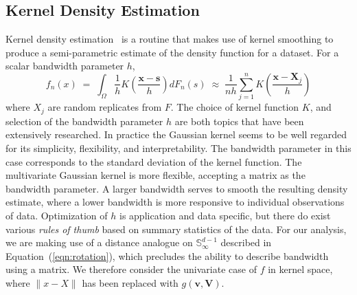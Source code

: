 
\subsection{Kernel Density Estimation}
Kernel density estimation~\citep{parzen1962} is a routine that makes use of 
    kernel smoothing to produce a semi-parametric estimate of the density
    function for a dataset.  For a scalar bandwidth parameter $h$,
    \[
        f_n(x) \;=\; 
            \int_{\Omega}\frac{1}{h}
                K\left(\frac{ \bm{x} - \bm{s}}{h}\right)dF_n(s) \;\approx\;
            \frac{1}{nh}\sum_{j = 1}^n
                K\left(\frac{ \bm{x} - \bm{X}_j}{h}\right)
    \]
    where $X_j$ are random replicates from $F$.  The choice of kernel function 
    $K$, and selection of the bandwidth parameter $h$ are both topics that have
    been extensively researched. In practice the Gaussian kernel seems to be 
    well regarded for its simplicity, flexibility, and interpretability.  The
    bandwidth parameter in this case corresponds to the standard deviation 
    of the kernel function.  The multivariate Gaussian kernel is more flexible,
    accepting a matrix as the bandwidth parameter.  A larger bandwidth serves 
    to smooth the resulting density estimate, where a lower bandwidth is more 
    responsive to individual observations of data.  Optimization of $h$ is 
    application and data specific, but there do exist various 
    \emph{rules of thumb} based on summary statistics of the data. For our 
    analysis, we are making use of a distance analogue on 
    $\mathbb{S}_{\infty}^{d-1}$ described in Equation~(\ref{eqn:rotation}), 
    which precludes the ability to describe bandwidth using a matrix.  We 
    therefore consider the univariate case of $f$ in kernel space, where 
    $\lVert x - X\rVert$ has been replaced with $g(\bm{v}, \bm{V})$.

